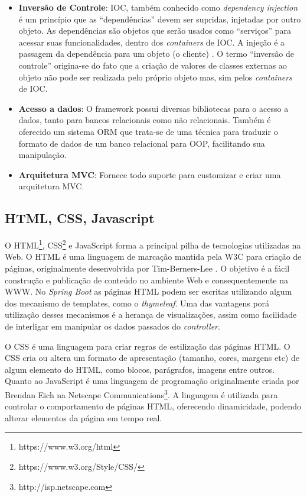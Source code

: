 \begin{itemize}
	\item{\textbf{Inversão de Controle}: \ac{IOC}, também conhecido como \textit{dependency injection} é um princípio que as “dependências” devem ser supridas, injetadas por outro objeto. As dependências são objetos que serão usados como “serviços” para acessar suas funcionalidades, dentro dos \textit{containers} de \ac{IOC}. A injeção é a passagem da dependência para um objeto (o cliente) \citep{DependencyInjection2006}. O termo “inversão de controle” origina-se do fato que a criação de valores de classes externas ao objeto não pode ser realizada pelo próprio objeto mas, sim pelos \textit{containers} de \ac{IOC}.}
	
	\item{\textbf{Acesso a dados}: O framework possui diversas bibliotecas para o acesso a dados, tanto para bancos relacionais como não relacionais. Também é oferecido um sistema ORM que trata-se de uma técnica para traduzir o formato de dados de um banco relacional para \ac{OOP}, facilitando sua manipulação.}
	
	\item{\textbf{Arquitetura MVC}: Fornece todo suporte para customizar e criar uma arquitetura \ac{MVC}.}
\end{itemize}

\subsection{HTML, CSS, Javascript}

O HTML\footnote{https://www.w3.org/html}, \ac{CSS}\footnote{https://www.w3.org/Style/CSS/} e JavaScript forma a principal pilha de tecnologias utilizadas na Web. O HTML é uma linguagem de marcação mantida pela \ac{W3C} para criação de páginas, originalmente desenvolvida por Tim-Berners-Lee \citep{Raggett1998}. O objetivo é a fácil construção e publicação de conteúdo no ambiente Web e consequentemente na \ac{WWW}. No \textit{Spring Boot} as páginas HTML podem ser escritas utilizando algum dos mecanismo de templates, como o \textit{thymeleaf}. Uma das vantagens porá utilização desses mecanismos é a herança de visualizações, assim como facilidade de interligar em manipular os dados passados do \textit{controller}.

O \ac{CSS} é uma linguagem para criar regras de estilização das páginas \ac{HTML}. O CSS cria ou altera um formato de apresentação (tamanho, cores, margens etc) de algum elemento do HTML, como blocos, parágrafos, imagens entre outros. Quanto ao JavaScript é uma linguagem de programação originalmente criada por Brendan Eich na Netscape Communications\footnote{ http://isp.netscape.com}. A linguagem é utilizada para controlar o comportamento de páginas HTML, oferecendo dinamicidade, podendo alterar elementos da página em tempo real.

